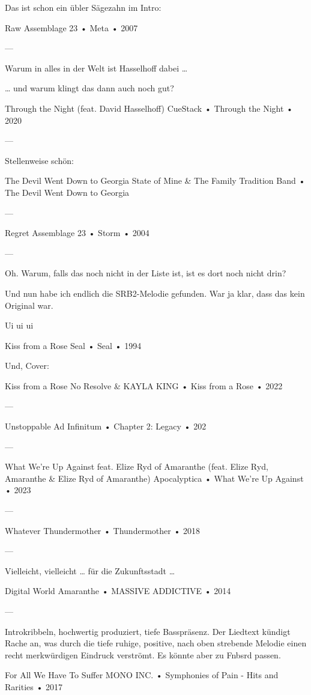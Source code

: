 Das ist schon ein übler Sägezahn im Intro:

Raw
Assemblage 23
 •
Meta
 •
2007


—

Warum in alles in der Welt ist Hasselhoff dabei …

… und warum klingt das dann auch noch gut?

Through the Night (feat. David Hasselhoff)
CueStack
 •
Through the Night
 •
2020

—

Stellenweise schön:

The Devil Went Down to Georgia
State of Mine
 &
The Family Tradition Band
 •
The Devil Went Down to Georgia

—

Regret
Assemblage 23
 •
Storm
 •
2004

—

Oh.
Warum, falls das noch nicht in der Liste ist, ist es dort noch nicht drin?

Und nun habe ich endlich die SRB2-Melodie gefunden. War ja klar, dass das kein Original war.

Ui ui ui

Kiss from a Rose
Seal
 •
Seal
 •
1994


Und, Cover:

Kiss from a Rose
No Resolve
 &
KAYLA KING
 •
Kiss from a Rose
 •
2022

—

Unstoppable
Ad Infinitum
 •
Chapter 2: Legacy
 • 202

—

What We're Up Against feat. Elize Ryd of Amaranthe (feat. Elize Ryd, Amaranthe & Elize Ryd of Amaranthe)
Apocalyptica
 •
What We're Up Against
 •
2023

—

Whatever
Thundermother
 •
Thundermother
 •
2018

—

Vielleicht, vielleicht … für die Zukunftsstadt …

Digital World
Amaranthe
 •
MASSIVE ADDICTIVE
 •
2014

—

Introkribbeln, hochwertig produziert, tiefe Basspräsenz.
Der Liedtext kündigt Rache an, was durch die tiefe ruhige, positive, nach oben strebende Melodie einen recht merkwürdigen Eindruck verströmt. Es könnte aber zu Fnbsrd passen.

For All We Have To Suffer
MONO INC.
 •
Symphonies of Pain - Hits and Rarities
 •
2017

